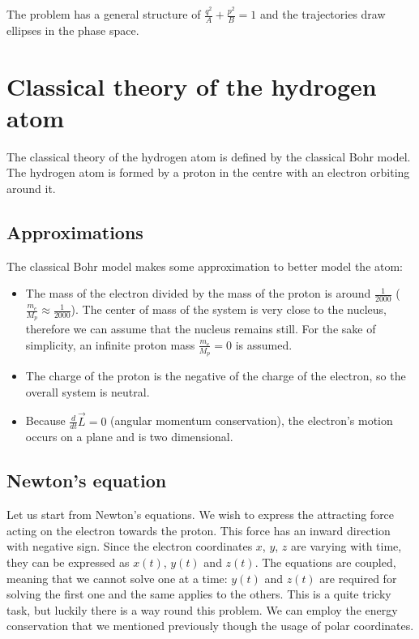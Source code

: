   The problem has a general structure of $\frac{q^2}{A}+\frac{p^2}{B}=1$ and the trajectories draw ellipses in the phase space.

\section{Classical theory of the hydrogen atom}
The classical theory of the hydrogen atom is defined by the classical Bohr model.
The hydrogen atom is formed by a proton in the centre with an electron orbiting around it.

  \subsection{Approximations}
  The classical Bohr model makes some approximation to better model the atom:
  \begin{multicols}{2}

    \begin{itemize}
      \item The mass of the electron divided by the mass of the proton is around $\frac{1}{2000}$ ($\frac{m_e}{M_p}\approx \frac{1}{2000}$).
        The center of mass of the system is very close to the nucleus, therefore we can assume that the nucleus remains still.
        For the sake of simplicity, an infinite proton mass $\frac{m_e}{M_p}=0$ is assumed.
      \item The charge of the proton is the negative of the charge of the electron, so the overall system is neutral.
      \item  Because $\frac{d{}}{d{t}}\vec{L}=0$ (angular momentum conservation), the electron's motion occurs on a plane and is two dimensional.
    \end{itemize}
  \end{multicols}

  \subsection{Newton's equation}
  Let us start from Newton's equations.
  We wish to express the attracting force acting on the electron towards the proton.
  This force has an inward direction with negative sign.
  Since the electron coordinates $x$, $y$, $z$ are varying with time, they can be expressed as $x(t)$, $y(t)$ and $z(t)$.
  The equations are coupled, meaning that we cannot solve one at a time: $y(t)$ and $z(t)$ are required for solving the first one and the same applies to the others.
  This is a quite tricky task, but luckily there is a way round this problem. We can employ the energy conservation that we mentioned previously though the usage of polar coordinates.


